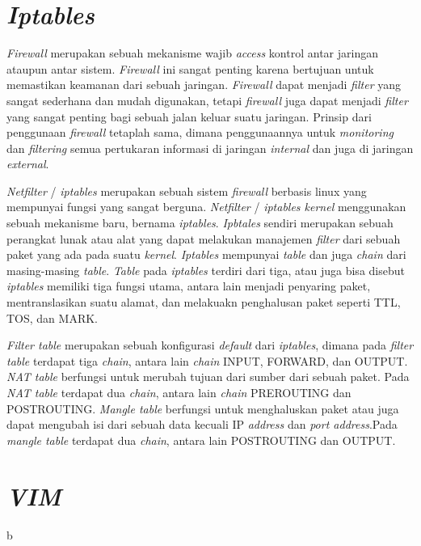  \section{\textit{Iptables}} 
 \textit{Firewall} merupakan sebuah mekanisme wajib \textit{access} kontrol antar jaringan ataupun antar sistem. \textit{Firewall} ini sangat penting karena bertujuan untuk memastikan keamanan dari sebuah jaringan. \textit{Firewall} dapat menjadi \textit{filter} yang sangat sederhana dan mudah digunakan, tetapi \textit{firewall} juga dapat menjadi \textit{filter} yang sangat penting bagi sebuah jalan keluar suatu jaringan. Prinsip dari penggunaan \textit{firewall} tetaplah sama, dimana penggunaannya untuk \textit{monitoring} dan \textit{filtering} semua pertukaran informasi di jaringan \textit{internal} dan juga di jaringan \textit{external}.
 
 \textit{Netfilter} / \textit{iptables} merupakan sebuah sistem \textit{firewall} berbasis linux yang mempunyai fungsi yang sangat berguna. \textit{Netfilter} / \textit{iptables kernel} menggunakan sebuah mekanisme baru, bernama \textit{iptables}. \textit{Ipbtales} sendiri merupakan sebuah perangkat lunak atau alat yang dapat melakukan manajemen \textit{filter} dari sebuah paket yang ada pada suatu \textit{kernel}. \textit{Iptables} mempunyai \textit{table} dan juga \textit{chain} dari masing-masing \textit{table}. \textit{Table} pada \textit{iptables} terdiri dari tiga, atau juga bisa disebut \textit{iptables} memiliki tiga fungsi utama, antara lain menjadi penyaring paket, mentranslasikan suatu alamat, dan melakuakn penghalusan paket seperti TTL, TOS, dan MARK.
 
 \textit{Filter table} merupakan sebuah konfigurasi \textit{default} dari \textit{iptables}, dimana pada \textit{filter table} terdapat tiga \textit{chain}, antara lain \textit{chain} INPUT, FORWARD, dan OUTPUT. \textit{NAT table} berfungsi untuk merubah tujuan dari sumber dari sebuah paket. Pada \textit{NAT table} terdapat dua \textit{chain}, antara lain \textit{chain} PREROUTING dan POSTROUTING. \textit{Mangle table} berfungsi untuk menghaluskan paket atau juga dapat mengubah isi dari sebuah data kecuali IP \textit{address} dan \textit{port address}.Pada \textit{mangle table} terdapat dua \textit{chain}, antara lain POSTROUTING dan OUTPUT.
 
 \section{\textit{VIM}}
 b
	 
